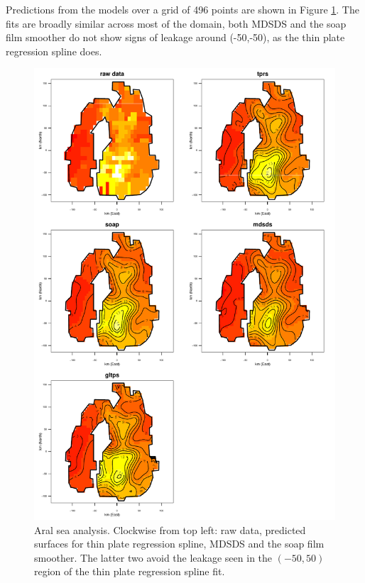 \documentclass[useAMS, referee]{biom}
\begin{document}
Predictions from the models over a grid of 496 points are shown in Figure \ref{aral-plot}. The fits are broadly similar across most of the domain, both MDSDS and the soap film smoother do not show signs of leakage around (-50,-50), as the thin plate regression spline does.



\begin{figure}
\centering
\includegraphics[width=\textwidth]{examples/aral/aral-plot.pdf}
\caption{Aral sea analysis. Clockwise from top left: raw data, predicted surfaces for thin plate regression spline, MDSDS and the soap film smoother. The latter two avoid the leakage seen in the $(-50, 50)$ region of the thin plate regression spline fit.}
\label{aral-plot}
\end{figure}
\end{document}
